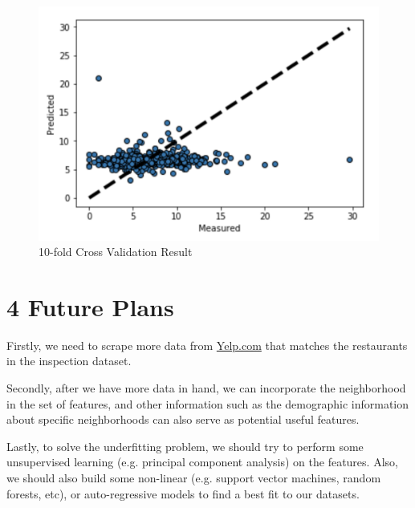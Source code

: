 \documentclass[letterpaper, 11 pt, conference]{ieeeconf}
\begin{document}
\begin{figure}[h]
	\centering
    \includegraphics[scale=0.25]{CV_result.png}
    \caption{10-fold Cross Validation Result}
\end{figure}

\section*{4 Future Plans}
Firstly, we need to scrape more data from \url{Yelp.com} that matches the restaurants in the inspection dataset. 

Secondly, after we have more data in hand, we can incorporate the neighborhood in the set of features, and other information such as the demographic information about specific neighborhoods can also serve as potential useful features. 

Lastly, to solve the underfitting problem, we should try to perform some unsupervised learning (e.g. principal component analysis) on the features. Also, we should also build some non-linear (e.g. support vector machines, random forests, etc), or auto-regressive models to find a best fit to our datasets. 
\end{document}
